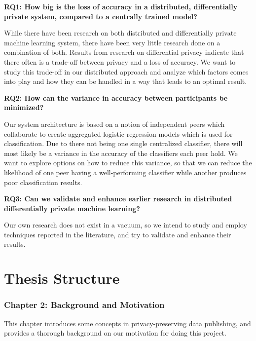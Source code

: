 \vspace{3mm}
\noindent\textbf{RQ1: How big is the loss of accuracy in a distributed, differentially private system, compared to a centrally trained model?}

\noindent While there have been research on both distributed and differentially private machine learning system, there have been very little research done on a combination of both. Results from research on differential privacy indicate that there often is a trade-off between privacy and a loss of accuracy. We want to study this trade-off in our distributed approach and analyze which factors comes into play and how they can be handled in a way that leads to an optimal result. 

\vspace{3mm}
\noindent
\textbf{RQ2: How can the variance in accuracy between participants be minimized?}

\noindent Our system architecture is based on a notion of independent peers which collaborate to create aggregated logistic regression models which is used for classification. Due to there not being one single centralized classifier, there will most likely be a variance in the accuracy of the classifiers each peer hold. We want to explore options on how to reduce this variance, so that we can reduce the likelihood of one peer having a well-performing classifier while another produces poor classification results. 

\vspace{3mm}
\noindent
\textbf{RQ3: Can we validate and enhance earlier research in distributed differentially private machine learning?}

\noindent Our own research does not exist in a vacuum, so we intend to study and employ techniques reported in the literature, and try to validate and enhance their results.   



\section{Thesis Structure}
\subsubsection{Chapter 2: Background and Motivation}
This chapter introduces some concepts in privacy-preserving data publishing, and provides a thorough background on our motivation for doing this project.

